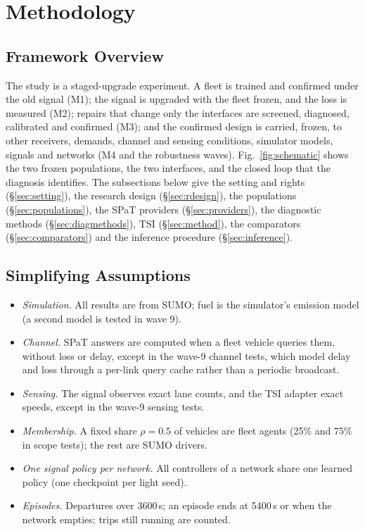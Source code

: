 \section{Methodology}\label{sec:methodology}
\subsection{Framework Overview}
The study is a staged-upgrade experiment. A fleet is trained and confirmed under the old signal (M1); the signal is upgraded with the fleet
frozen, and the loss is measured (M2); repairs that change only the interfaces are screened, diagnosed, calibrated and confirmed (M3); and
the confirmed design is carried, frozen, to other receivers, demands, channel and sensing conditions, simulator models, signals and
networks (M4 and the robustness waves). Fig.~\ref{fig:schematic} shows the two frozen populations, the two interfaces, and the closed loop
that the diagnosis identifies. The subsections below give the setting and rights (§\ref{sec:setting}), the research design
(§\ref{sec:rdesign}), the populations (§\ref{sec:populations}), the SPaT providers (§\ref{sec:providers}), the diagnostic methods
(§\ref{sec:diagmethods}), TSI (§\ref{sec:method}), the comparators (§\ref{sec:comparators}) and the inference procedure
(§\ref{sec:inference}).

\subsection{Simplifying Assumptions}
\begin{itemize}\setlength\itemsep{1pt}
\item \emph{Simulation.} All results are from SUMO; fuel is the simulator's emission model (a second model is tested in wave 9).
\item \emph{Channel.} SPaT answers are computed when a fleet vehicle queries them, without loss or delay, except in the wave-9 channel tests, which model
delay and loss through a per-link query cache rather than a periodic broadcast.
\item \emph{Sensing.} The signal observes exact lane counts, and the TSI adapter exact speeds, except in the wave-9 sensing tests.
\item \emph{Membership.} A fixed share $\rho=0.5$ of vehicles are fleet agents (25\% and 75\% in scope tests); the rest are SUMO drivers.
\item \emph{One signal policy per network.} All controllers of a network share one learned policy (one checkpoint per light seed).
\item \emph{Episodes.} Departures over 3600\,s; an episode ends at 5400\,s or when the network empties; trips still running are counted.
\end{itemize}
